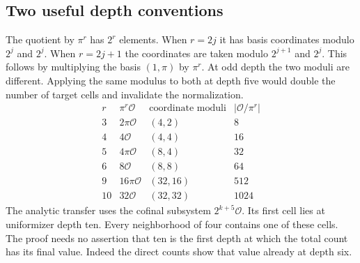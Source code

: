 \documentclass[12pt,letterpaper]{article}
\begin{document}
\subsection{Two useful depth conventions}
The quotient by $\pi^r$ has $2^r$ elements. When $r=2j$ it has basis coordinates modulo $2^j$ and $2^j$. When $r=2j+1$ the coordinates are taken modulo $2^{j+1}$ and $2^j$. This follows by multiplying the basis $(1,\pi)$ by $\pi^r$. At odd depth the two moduli are different. Applying the same modulus to both at depth five would double the number of target cells and invalidate the normalization.
\[
\begin{array}{c|c|c|c}
 r&\pi^r\mathcal O& \text{coordinate moduli}& |\mathcal O/\pi^r|\\\hline
 3&2\pi\mathcal O&(4,2)&8\\
 4&4\mathcal O&(4,4)&16\\
 5&4\pi\mathcal O&(8,4)&32\\
 6&8\mathcal O&(8,8)&64\\
 9&16\pi\mathcal O&(32,16)&512\\
 10&32\mathcal O&(32,32)&1024
\end{array}
\]
The analytic transfer uses the cofinal subsystem $2^{k+5}\mathcal O$. Its first cell lies at uniformizer depth ten. Every neighborhood of four contains one of these cells. The proof needs no assertion that ten is the first depth at which the total count has its final value. Indeed the direct counts show that value already at depth six.
\end{document}
